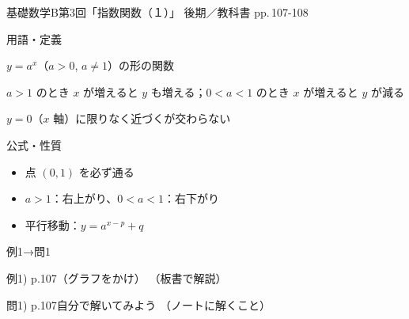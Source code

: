 \documentclass[aspectratio=43,professionalfonts,handout]{beamer}
\newcommand{\LectureNum}{3}
\newcommand{\LectureTitle}{指数関数（１）}
\newcommand{\TextPages}{pp.\,107-108}
\newcommand{\CourseName}{基礎数学B}
\renewcommand{\TermName}{後期}
\begin{document}
\begin{frame}{\CourseName\quad 第\LectureNum 回「\LectureTitle 」}
  {\small \TermName\quad \TeacherName\quad ／\quad 教科書 \TextPages}

  \begin{block}{用語・定義}
  \begin{description}[labelwidth=5.5em]
    \item[\kw{指数関数：$y = a^x$（$a > 0$, $a \neq 1$）}] $y = a^x$（$a > 0$, $a \neq 1$）の形の関数
    \item[\kw{単調増加（$a > 1$）・単調減少（$0 < a < 1$）}] $a > 1$ のとき $x$ が増えると $y$ も増える；$0 < a < 1$ のとき $x$ が増えると $y$ が減る
    \item[\kw{漸近線：$y = 0$（$x$ 軸）}] $y = 0$（$x$ 軸）に限りなく近づくが交わらない
  \end{description}
  \end{block}
\end{frame}

\begin{frame}{公式・性質}
  \begin{block}{}
  \begin{itemize}
    \item 点 $(0, 1)$ を必ず通る
    \item $a > 1$：右上がり、$0 < a < 1$：右下がり
    \item 平行移動：$y = a^{x-p} + q$
  \end{itemize}
  \end{block}
\end{frame}

\begin{frame}{例1→問1}
  \begin{exampleblock}{例1) p.107（グラフをかけ）}
    （板書で解説）
  \end{exampleblock}

  \vfill

  \begin{block}{問1) p.107\quad 自分で解いてみよう}
    （ノートに解くこと）
  \end{block}
\end{frame}
\end{document}
